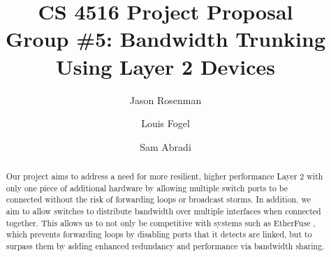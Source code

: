 \documentclass{article}
\title{CS 4516 Project Proposal\\Group \#5: Bandwidth Trunking Using Layer 2 Devices}
\author{Jason Rosenman \and Louis Fogel \and Sam Abradi}
\date{}
\begin{document}
\maketitle
\begin{abstract}
	Our project aims to address a need for more resilient, higher performance Layer 2 with only one piece of additional hardware by allowing multiple switch ports to be connected without the risk of forwarding loops or broadcast storms.
	In addition, we aim to allow switches to distribute bandwidth over multiple interfaces when connected together.
	This allows us to not only be competitive with systems such as EtherFuse \cite{etherfuse}, which prevents forwarding loops by disabling ports that it detects are linked, but to surpass them by adding enhanced redundancy and performance via bandwidth sharing.
\end{abstract}
\end{document}

